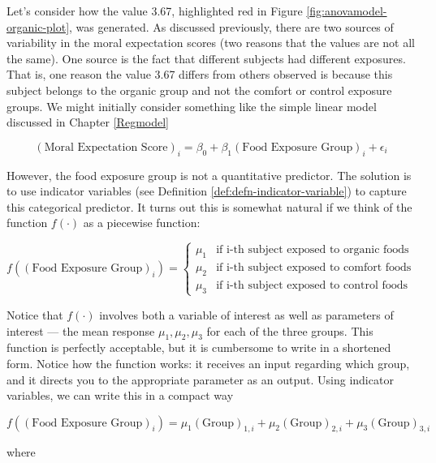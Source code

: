 \documentclass[]{book}
\theoremstyle{plain}
\theoremstyle{mydefn}
\theoremstyle{myexmpl}
\theoremstyle{remark}
\begin{document}
Let's consider how the value 3.67, highlighted red in Figure
\ref{fig:anovamodel-organic-plot}, was generated. As discussed
previously, there are two sources of variability in the moral
expectation scores (two reasons that the values are not all the same).
One source is the fact that different subjects had different exposures.
That is, one reason the value 3.67 differs from others observed is
because this subject belongs to the organic group and not the comfort or
control exposure groups. We might initially consider something like the
simple linear model discussed in Chapter \ref{Regmodel}

\[(\text{Moral Expectation Score})_i = \beta_0 + \beta_1 (\text{Food Exposure Group})_i + \epsilon_i\]

However, the food exposure group is not a quantitative predictor. The
solution is to use indicator variables (see Definition
\ref{def:defn-indicator-variable}) to capture this categorical
predictor. It turns out this is somewhat natural if we think of the
function \(f(\cdot)\) as a piecewise function:

\[
f\left((\text{Food Exposure Group})_i\right) = \begin{cases}
  \mu_1 & \text{if i-th subject exposed to organic foods} \\
  \mu_2 & \text{if i-th subject exposed to comfort foods} \\
  \mu_3 & \text{if i-th subject exposed to control foods} \end{cases}
\]

Notice that \(f(\cdot)\) involves both a variable of interest as well as
parameters of interest --- the mean response \(\mu_1, \mu_2, \mu_3\) for
each of the three groups. This function is perfectly acceptable, but it
is cumbersome to write in a shortened form. Notice how the function
works: it receives an input regarding which group, and it directs you to
the appropriate parameter as an output. Using indicator variables, we
can write this in a compact way

\[f\left((\text{Food Exposure Group})_i\right) = \mu_1 (\text{Group})_{1,i} + \mu_2 (\text{Group})_{2,i} + \mu_3 (\text{Group})_{3,i}\]

where
\end{document}
